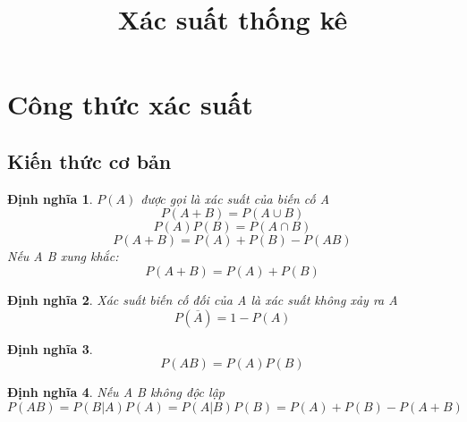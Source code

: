 \documentclass[12pt]{article}
\def\bar#1{\overline{#1}}
\newtheorem{thm}{Định nghĩa}
\begin{document}
\title{Xác suất thống kê}
\date{}
\maketitle

\section{Công thức xác suất}
\subsection{Kiến thức cơ bản}
\begin{thm}
$P(A)$ được gọi là xác suất của biến cố A
\begin{equation}
    P(A + B) = P( A \cup B) 
\end{equation}
\begin{equation}
    P(A)P(B) = P(A \cap B) 
 \end{equation}
\begin{equation}
    P(A + B) = P(A) + P(B) - P(AB)
    \end{equation}
Nếu A B xung khắc:
\begin{equation}
P(A + B) = P(A) + P(B) 
\end{equation}
\end{thm}

\begin{thm}
Xác suất biến cố đối của A là xác suất không xảy ra A
\begin{equation}
P(\bar{A}) = 1 - P(A)
\end{equation}
\end{thm}
\begin{thm}
\begin{equation}
    P(AB) = P(A)P(B)
\end{equation}
\end{thm}

\begin{thm}
Nếu A B không độc lập
\begin{equation}
    P(AB) = P(B|A)P(A) = P(A|B)P(B) = P(A) + P(B) - P(A + B)
\end{equation}
\end{thm}
\end{document}
